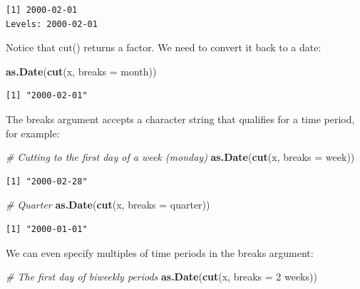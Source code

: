 \documentclass[
]{book}
\newenvironment{Shaded}{\begin{snugshade}}{\end{snugshade}}
\newcommand{\AttributeTok}[1]{\textcolor[rgb]{0.13,0.29,0.53}{#1}}
\newcommand{\CommentTok}[1]{\textcolor[rgb]{0.56,0.35,0.01}{\textit{#1}}}
\newcommand{\FunctionTok}[1]{\textcolor[rgb]{0.13,0.29,0.53}{\textbf{#1}}}
\newcommand{\NormalTok}[1]{#1}
\newcommand{\StringTok}[1]{\textcolor[rgb]{0.31,0.60,0.02}{#1}}
\begin{document}
\begin{verbatim}
[1] 2000-02-01
Levels: 2000-02-01
\end{verbatim}

Notice that cut() returns a factor. We need to convert it back to a date:

\begin{Shaded}
\begin{Highlighting}[]
\FunctionTok{as.Date}\NormalTok{(}\FunctionTok{cut}\NormalTok{(x, }\AttributeTok{breaks =} \StringTok{\textquotesingle{}month\textquotesingle{}}\NormalTok{))}
\end{Highlighting}
\end{Shaded}

\begin{verbatim}
[1] "2000-02-01"
\end{verbatim}

The breaks argument accepts a character string that qualifies for a time period, for example:

\begin{Shaded}
\begin{Highlighting}[]
\CommentTok{\# Cutting to the first day of a week (monday)}
\FunctionTok{as.Date}\NormalTok{(}\FunctionTok{cut}\NormalTok{(x, }\AttributeTok{breaks =} \StringTok{\textquotesingle{}week\textquotesingle{}}\NormalTok{))}
\end{Highlighting}
\end{Shaded}

\begin{verbatim}
[1] "2000-02-28"
\end{verbatim}

\begin{Shaded}
\begin{Highlighting}[]
\CommentTok{\# Quarter}
\FunctionTok{as.Date}\NormalTok{(}\FunctionTok{cut}\NormalTok{(x, }\AttributeTok{breaks =} \StringTok{\textquotesingle{}quarter\textquotesingle{}}\NormalTok{))}
\end{Highlighting}
\end{Shaded}

\begin{verbatim}
[1] "2000-01-01"
\end{verbatim}

We can even specify multiples of time periods in the breaks argument:

\begin{Shaded}
\begin{Highlighting}[]
\CommentTok{\# The first day of biweekly periods}
\FunctionTok{as.Date}\NormalTok{(}\FunctionTok{cut}\NormalTok{(x, }\AttributeTok{breaks =} \StringTok{\textquotesingle{}2 weeks\textquotesingle{}}\NormalTok{))}
\end{Highlighting}
\end{Shaded}
\end{document}
